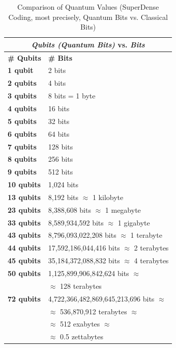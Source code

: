 \documentclass[conference]{IEEEtran}
\begin{document}
\begin{table}[!hp]
\centering
    \caption{Comparison of Quantum Values (SuperDense Coding, most precisely, Quantum Bits vs. Classical Bits)}
    \begin{tabular}{ |p{1.8cm}|p{5.8cm}| }
     \hline
     \multicolumn{2}{|c|}{\textbf{\textit{Qubits (Quantum Bits)} vs. \textit{Bits}}} \\
     \hline
     \hline
     \textbf{\# Qubits} & \textbf{\# Bits}\\
     \hline
     \hline
     \textbf{1 qubit} & 2 bits \\
     \hline
     \textbf{2 qubits} & 4 bits \\
     \hline
     \textbf{3 qubits} & 8 bits = 1 byte \\
     \hline
     \textbf{4 qubits} & 16 bits \\
     \hline
     \textbf{5 qubits} & 32 bits \\
     \hline
     \textbf{6 qubits} & 64 bits \\
     \hline
     \textbf{7 qubits} & 128 bits \\
     \hline
     \textbf{8 qubits} & 256 bits \\
     \hline
     \textbf{9 qubits} & 512 bits \\
     \hline
     \textbf{10 qubits} & 1,024 bits \\
     \hline
     \textbf{13 qubits} & 8,192 bits $\approx$ 1 kilobyte \\
     \hline
     \textbf{23 qubits} & 8,388,608 bits $\approx$ 1 megabyte \\
     \hline
     \textbf{33 qubits} & 8,589,934,592 bits $\approx$ 1 gigabyte \\
     \hline
     \textbf{43 qubits} & 8,796,093,022,208 bits $\approx$ 1 terabyte \\
     \hline
     \textbf{44 qubits} & 17,592,186,044,416 bits $\approx$ 2 terabytes \\
     \hline
     \textbf{45 qubits} & 35,184,372,088,832 bits $\approx$ 4 terabytes \\
     \hline
     \textbf{50 qubits} & 1,125,899,906,842,624 bits $\approx$ \\ & $\approx$ 128 terabytes \\
     \hline
     \textbf{72 qubits} & 4,722,366,482,869,645,213,696 bits $\approx$ \\ & $\approx$ 536,870,912 terabytes $\approx$ \\ & $\approx$ 512 exabytes $\approx$ \\ & $\approx$ 0.5 zettabytes \\

\end{tabular}
\end{table}
\end{document}
